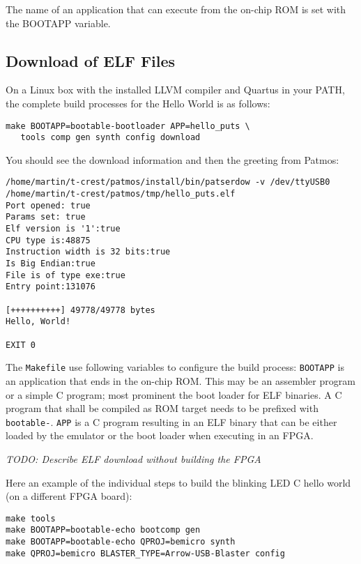 \documentclass[a4paper,fontsize=10pt,twoside,DIV15,BCOR12mm,headinclude=true,footinclude=false,pagesize,bibtotoc]{scrbook}
\newcommand{\code}[1]{{\texttt{#1}}}
\newcommand{\todo}[1]{{\emph{TODO: #1}}}
\begin{document}
The name of an application that can execute from the on-chip ROM is set
with the BOOTAPP variable.

\subsection{Download of ELF Files}

On a Linux box with the installed LLVM compiler and Quartus in your PATH,
the complete build processes for the Hello World is as follows:

\begin{verbatim}
make BOOTAPP=bootable-bootloader APP=hello_puts \
   tools comp gen synth config download
\end{verbatim}

You should see the download information and then the greeting from Patmos:

\begin{verbatim}
/home/martin/t-crest/patmos/install/bin/patserdow -v /dev/ttyUSB0 /home/martin/t-crest/patmos/tmp/hello_puts.elf
Port opened: true
Params set: true
Elf version is '1':true
CPU type is:48875
Instruction width is 32 bits:true
Is Big Endian:true
File is of type exe:true
Entry point:131076

[++++++++++] 49778/49778 bytes
Hello, World!

EXIT 0
\end{verbatim}

The \code{Makefile} use following variables to configure the build process:
\code{BOOTAPP} is an application that ends in the on-chip ROM. This may
be an assembler program or a simple C program;
most prominent the boot loader for ELF binaries.
A C program that shall be compiled as ROM target needs to be prefixed
with \code{bootable-}.
\code{APP} is a C program resulting in an ELF binary that can be either
loaded by the emulator or the boot loader when executing in an FPGA.

\todo{Describe ELF download without building the FPGA}


Here an example of the individual steps to build the blinking LED C
hello world (on a different FPGA board):
\begin{verbatim}
make tools
make BOOTAPP=bootable-echo bootcomp gen
make BOOTAPP=bootable-echo QPROJ=bemicro synth
make QPROJ=bemicro BLASTER_TYPE=Arrow-USB-Blaster config
\end{verbatim}
\end{document}
